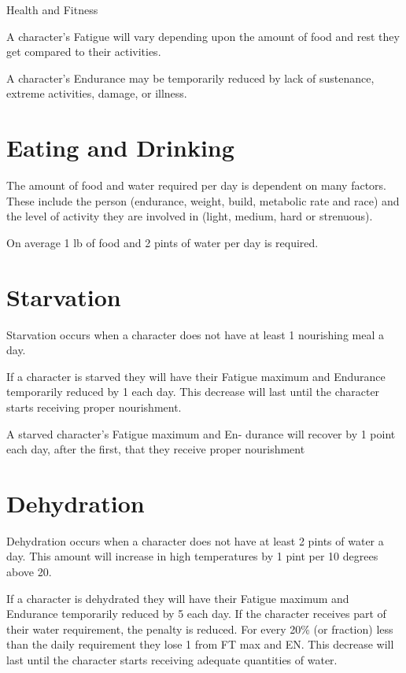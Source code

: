 \begin{Chapter}{Health and Fitness}

A character’s Fatigue will vary depending upon the amount of food and
rest they get compared to their activities.

A character’s Endurance may be temporarily reduced by lack of
sustenance, extreme activities, damage, or illness.

\section{Eating and Drinking}

The amount of food and water required per day is dependent on many
factors.  These include the person (endurance, weight, build,
metabolic rate and race) and the level of activity they are involved
in (light, medium, hard or strenuous).

On  average  1  lb  of  food  and  2  pints  of  water  per 
day is required. 


\section{Starvation}

Starvation occurs when a character does not have at least 1 nourishing
meal a day.

If a character is starved they will have their Fatigue maximum and
Endurance temporarily reduced by 1 each day. This decrease will last
until the character starts receiving proper nourishment.

A starved character’s Fatigue maximum and En- durance will recover by
1 point each day, after the first, that they receive proper
nourishment


\section{Dehydration}

Dehydration occurs when a character does not have at least 2 pints of
water a day.  This amount will increase in high temperatures by 1 pint
per 10 degrees above 20.

If a character is dehydrated they will have their Fatigue maximum and
Endurance temporarily reduced by 5 each day.  If the character
receives part of their water requirement, the penalty is reduced.
For every 20\% (or fraction) less than the daily requirement they lose
1 from FT max and EN. This decrease will last until the character
starts receiving adequate quantities of water.


\end{Chapter}
